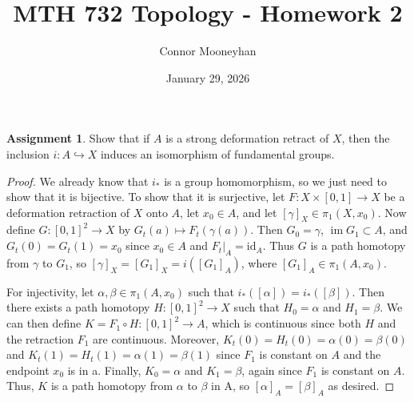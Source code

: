 \documentclass[12pt]{article}
\title{MTH 732 Topology - Homework 2}
\author{Connor Mooneyhan}
\date{January 29, 2026}
\DeclareMathOperator{\im}{im}
\theoremstyle{definition}
\newtheorem{ex}{Assignment}
\begin{document}
\maketitle

\begin{ex}
	Show that if $A$ is a strong deformation retract of $X$, then the inclusion $i : A \hookrightarrow X$ induces an isomorphism of fundamental groups.
\end{ex}
\begin{proof}
	We already know that $i_*$ is a group homomorphism, so we just need to show that it is bijective.
	To show that it is surjective, let $F: X \times [0, 1] \to X$ be a deformation retraction of $X$ onto $A$, let $x_0 \in A$, and let $[\gamma]_X \in \pi_1(X, x_0)$.
	Now define $G : [0, 1]^2 \to X$ by $G_t(a) \mapsto F_t(\gamma(a))$.
	Then $G_0 = \gamma$, $\im G_1 \subset A$, and $G_t(0) = G_t(1) = x_0$ since $x_0 \in A$ and $F_t|_A = \mathrm{id}_A$.
	Thus $G$ is a path homotopy from $\gamma$ to $G_1$, so $[\gamma]_X = [G_1]_X = i([G_1]_A)$, where $[G_1]_A \in \pi_1(A, x_0)$.

	For injectivity, let $\alpha, \beta \in \pi_1(A, x_0)$ such that $i_*([\alpha]) = i_*([\beta])$.
	Then there exists a path homotopy $H : [0, 1]^2 \to X$ such that $H_0 = \alpha$ and $H_1 = \beta$.
	We can then define $K = F_1 \circ H : [0, 1]^2 \to A$, which is continuous since both $H$ and the retraction $F_1$ are continuous.
	Moreover, $K_t(0) = H_t(0) = \alpha(0) = \beta(0)$ and $K_t(1) = H_t(1) = \alpha(1) = \beta(1)$ since $F_1$ is constant on $A$ and the endpoint $x_0$ is in a.
	Finally, $K_0 = \alpha$ and $K_1 = \beta$, again since $F_1$ is constant on $A$.
	Thus, $K$ is a path homotopy from $\alpha$ to $\beta$ in A, so $[\alpha]_A = [\beta]_A$ as desired.
\end{proof}
\end{document}
